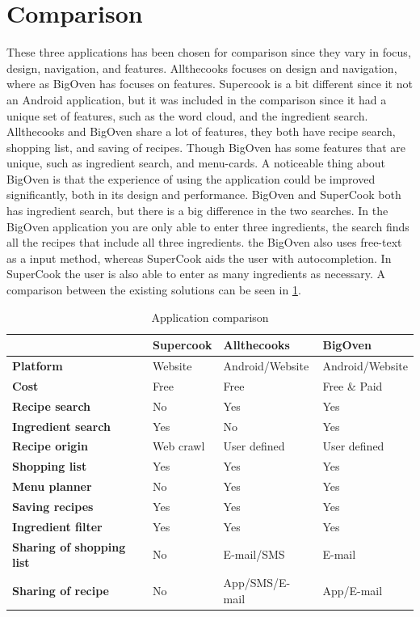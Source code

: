 \section{Comparison}
These three applications has been chosen for comparison since they vary in focus, design, navigation, and features. Allthecooks focuses on design and navigation, where as BigOven has focuses on features. Supercook is a bit different since it not an Android application, but it was included in the comparison since it had a unique set of features, such as the word cloud, and the ingredient search.
Allthecooks and BigOven share a lot of features, they both have recipe search, shopping list, and saving of recipes. Though BigOven has some features that are unique, such as ingredient search, and menu-cards. A noticeable thing about BigOven is that the experience of using the application could be improved significantly, both in its design and performance.
BigOven and SuperCook both has ingredient search, but there is a big difference in the two searches. In the BigOven application you are only able to enter three ingredients, the search finds all the recipes that include all three ingredients. the BigOven also uses free-text as a input method, whereas SuperCook aids the user with autocompletion. In SuperCook the user is also able to enter as many ingredients as necessary.
A comparison between the existing solutions can be seen in \ref{tab:appcomparison}.

\begin{table}[H]
\centering
\begin{tabular}{|l|l|l|l|}
\hline
 & \textbf{Supercook} & \textbf{Allthecooks} & \textbf{BigOven} \\
\hline
\textbf{Platform} & Website & Android/Website & Android/Website \\
\hline
\textbf{Cost} & Free & Free & Free \& Paid \\
\hline
\textbf{Recipe search} & No & Yes & Yes  \\
\hline
\textbf{Ingredient search} & Yes & No & Yes \\
\hline
\textbf{Recipe origin} & Web crawl & User defined & User defined \\
\hline
\textbf{Shopping list} & Yes & Yes & Yes \\
\hline
\textbf{Menu planner} & No & Yes & Yes \\
\hline
\textbf{Saving recipes} & Yes & Yes & Yes \\
\hline
\textbf{Ingredient filter} & Yes & Yes & Yes \\
\hline
\textbf{Sharing of shopping list} & No & E-mail/SMS & E-mail \\
\hline
\textbf{Sharing of recipe} & No & App/SMS/E-mail & App/E-mail \\
\hline
\end{tabular}
\caption{Application comparison}
\label{tab:appcomparison}
\end{table}

